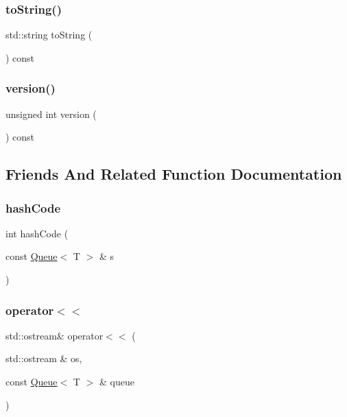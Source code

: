 \mbox{\label{classQueue_a1fe5121d6528fdea3f243321b3fa3a49}} 
\subsubsection{\texorpdfstring{to\+String()}{toString()}}
{\footnotesize\ttfamily std\+::string to\+String (\begin{DoxyParamCaption}{ }\end{DoxyParamCaption}) const}

\mbox{\label{classQueue_a0aa696ccb72cbf928535d6b646bac1aa}} 
\subsubsection{\texorpdfstring{version()}{version()}}
{\footnotesize\ttfamily unsigned int version (\begin{DoxyParamCaption}{ }\end{DoxyParamCaption}) const}



\subsection{Friends And Related Function Documentation}
\mbox{\label{classQueue_aacd62c6f29c1e575d1290a1088dd29e1}} 
\subsubsection{\texorpdfstring{hash\+Code}{hashCode}}
{\footnotesize\ttfamily int hash\+Code (\begin{DoxyParamCaption}\item[{const \mbox{\hyperlink{classQueue}{Queue}}$<$ T $>$ \&}]{s }\end{DoxyParamCaption})\hspace{0.3cm}{\ttfamily [friend]}}

\mbox{\label{classQueue_aaa89558f231cdb840804e46fc467902e}} 
\subsubsection{\texorpdfstring{operator$<$$<$}{operator<<}}
{\footnotesize\ttfamily std\+::ostream\& operator$<$$<$ (\begin{DoxyParamCaption}\item[{std\+::ostream \&}]{os,  }\item[{const \mbox{\hyperlink{classQueue}{Queue}}$<$ T $>$ \&}]{queue }\end{DoxyParamCaption})\hspace{0.3cm}{\ttfamily [friend]}}

